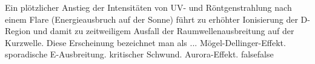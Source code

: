     {Ein plötzlicher Anstieg der Intensitäten von UV- und Röntgenstrahlung nach einem Flare (Energieausbruch auf der Sonne) führt zu erhöhter Ionisierung der D-Region und damit zu zeitweiligem Ausfall der Raumwellenausbreitung auf der Kurzwelle. Diese Erscheinung bezeichnet man als ...}
    {Mögel-Dellinger-Effekt.}
    {sporadische E-Ausbreitung.}
    {kritischer Schwund.}
    {Aurora-Effekt.}
    {false}{false}